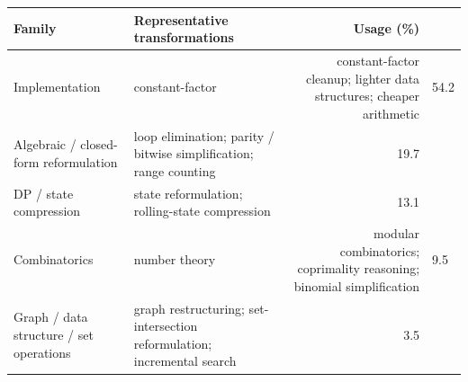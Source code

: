 \begin{tabular}{p{3.6cm}p{7.1cm}r}
\toprule
Family & Representative transformations & Usage (\%) \\
\midrule
Implementation & constant-factor & constant-factor cleanup; lighter data structures; cheaper arithmetic & 54.2 \\
Algebraic / closed-form reformulation & loop elimination; parity / bitwise simplification; range counting & 19.7 \\
DP / state compression & state reformulation; rolling-state compression & 13.1 \\
Combinatorics & number theory & modular combinatorics; coprimality reasoning; binomial simplification & 9.5 \\
Graph / data structure / set operations & graph restructuring; set-intersection reformulation; incremental search & 3.5 \\
\bottomrule
\end{tabular}
